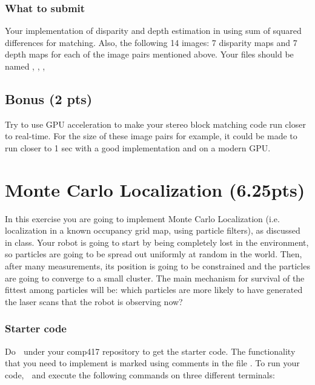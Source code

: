 \documentclass[a4paper,10pt]{article}
\begin{document}
\subsubsection{What to submit}
Your implementation of disparity and depth estimation in  using sum of squared differences for matching. Also, the following 14 images: 
7 disparity maps and 7 depth maps for each of the image pairs mentioned above. Your files should be named , , , 

\subsection{Bonus (2 pts)}
Try to use GPU acceleration to make your stereo block matching code run closer to real-time. For the size of these image pairs for example, it could be made to run closer to 1 sec
with a good implementation and on a modern GPU. 

\section{Monte Carlo Localization (6.25pts)}
In this exercise you are going to implement Monte Carlo Localization (i.e. localization in a known occupancy grid map, using particle filters), as discussed in class. Your robot
is going to start by being completely lost in the environment, so particles are going to be spread out uniformly at random in the world. Then, after many
measurements, its position is going to be constrained and the particles are going to converge to a small cluster. The main mechanism for survival of the fittest among particles
will be: which particles are more likely to have generated the laser scans that the robot is observing now?



\subsubsection{Starter code}
Do  $\;$  under your comp417 repository to get the starter code. The functionality that you need to implement is marked using comments in the file 
. To run your code,  $\;$  and 
execute the following commands on three different terminals: 
\newline
\end{document}
